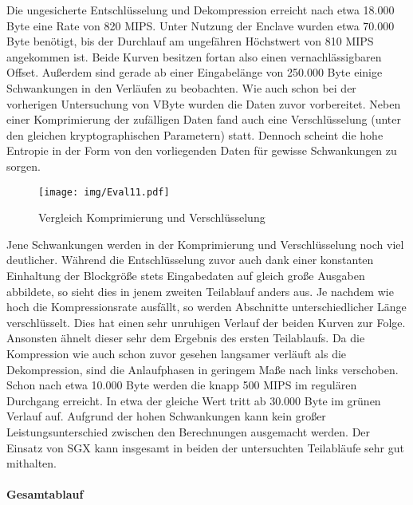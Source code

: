 Die ungesicherte Entschlüsselung und Dekompression erreicht nach etwa 18.000 Byte eine Rate von 820 \ac{MIPS}. Unter Nutzung der Enclave wurden etwa 70.000 Byte benötigt, bis der Durchlauf am ungefähren Höchstwert von 810 \ac{MIPS} angekommen ist. Beide Kurven besitzen fortan also einen vernachlässigbaren Offset. Außerdem sind gerade ab einer Eingabelänge von 250.000 Byte einige Schwankungen in den Verläufen zu beobachten. Wie auch schon bei der vorherigen Untersuchung von VByte wurden die Daten zuvor vorbereitet. Neben einer Komprimierung der zufälligen Daten fand auch eine Verschlüsselung (unter den gleichen kryptographischen Parametern) statt. Dennoch scheint die hohe Entropie in der Form von den vorliegenden Daten für gewisse Schwankungen zu sorgen.

\begin{figure}[h]
	\texttt{[image: img/Eval11.pdf]}
	\centering
	\caption{Vergleich Komprimierung und Verschlüsselung}
	\label{fig:eval11}
\end{figure}

Jene Schwankungen werden in der Komprimierung und Verschlüsselung noch viel deutlicher. Während die Entschlüsselung zuvor auch dank einer konstanten Einhaltung der Blockgröße stets Eingabedaten auf gleich große Ausgaben abbildete, so sieht dies in jenem zweiten Teilablauf anders aus. Je nachdem wie hoch die Kompressionsrate ausfällt, so werden Abschnitte unterschiedlicher Länge verschlüsselt. Dies hat einen sehr unruhigen Verlauf der beiden Kurven zur Folge. Ansonsten ähnelt dieser sehr dem Ergebnis des ersten Teilablaufs. Da die Kompression wie auch schon zuvor gesehen langsamer verläuft als die Dekompression, sind die Anlaufphasen in geringem Maße nach links verschoben. Schon nach etwa 10.000 Byte werden die knapp 500 \ac{MIPS} im regulären Durchgang erreicht. In etwa der gleiche Wert tritt ab 30.000 Byte im grünen Verlauf auf. Aufgrund der hohen Schwankungen kann kein großer Leistungsunterschied zwischen den Berechnungen ausgemacht werden. Der Einsatz von \ac{SGX} kann insgesamt in beiden der untersuchten Teilabläufe sehr gut mithalten.

\paragraph{Gesamtablauf}


